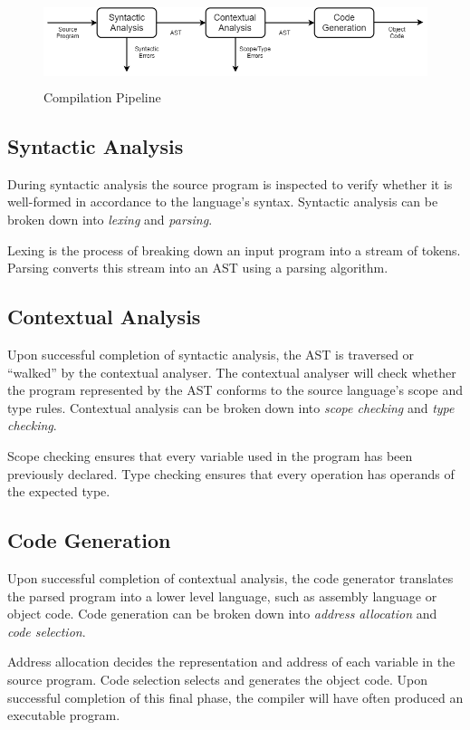\documentclass{l4proj}
\begin{document}
\begin{figure}
\centering
\includegraphics[height=2.5cm,width=13cm]{images/3-2a.png}
\caption{Compilation Pipeline}
\label{fig:compilation-pipeline}	
\end{figure}

\subsection{Syntactic Analysis}
During syntactic analysis the source program is inspected to verify whether it is well-formed in accordance to the language's syntax. Syntactic analysis can be broken down into \textit{lexing} and \textit{parsing}.

Lexing is the process of breaking down an input program into a stream of tokens. Parsing converts this stream into an AST using a parsing algorithm.

\subsection{Contextual Analysis}
Upon successful completion of syntactic analysis, the AST is traversed or ``walked'' by the contextual analyser. The contextual analyser will check whether the program represented by the AST conforms to the source language's scope and type rules. Contextual analysis can be broken down into \textit{scope checking} and \textit{type checking}.

Scope checking ensures that every variable used in the program has been previously declared. Type checking ensures that every operation has operands of the expected type.

\subsection{Code Generation}
Upon successful completion of contextual analysis, the code generator translates the parsed program into a lower level language, such as assembly language or object code. Code generation can be broken down into \textit{address allocation} and \textit{code selection}.

Address allocation decides the representation and address of each variable in the source program. Code selection selects and generates the object code. Upon successful completion of this final phase, the compiler will have often produced an executable program.
\end{document}
